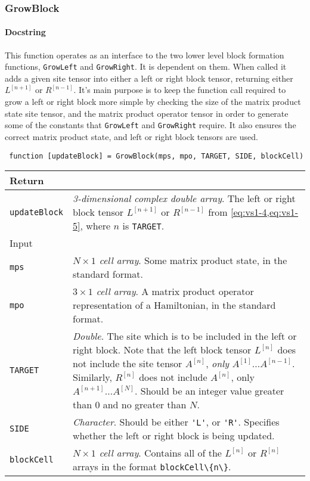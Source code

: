  \subsubsection{GrowBlock}
 \paragraph{Docstring} This function operates as an interface to the two lower level block formation functions, \lstinline$GrowLeft$ and \lstinline$GrowRight$. It is dependent on them. When called it adds a given site tensor into either a left or right block tensor, returning either \(L^{[n+1]}\) or \(R^{[n-1]}\). It's main purpose is to keep the function call required to grow a left or right block more simple by checking the size of the matrix product state site tensor, and the matrix product operator tensor in order to generate some of the constants that \lstinline$GrowLeft$ and \lstinline$GrowRight$ require. It also ensures the correct matrix product state, and left or right block tensors are used.
 \begin{lstlisting}
 function [updateBlock] = GrowBlock(mps, mpo, TARGET, SIDE, blockCell) \end{lstlisting}
 \begin{longtabu}{X[1,l]X[4,l]}
 \hline
 Return & \\ \hline
 \lstinline$updateBlock$ & \emph{3-dimensional complex double array}. The left or right block tensor \(L^{[n+1]}\) or \(R^{[n-1]}\) from \cref{eq:vs1-4,eq:vs1-5}, where \(n\) is \lstinline$TARGET$. \\ \hline
 Input & \\ \hline
 \lstinline$mps$ & \emph{\(N \times 1\) cell array}. Some matrix product state, in the standard format. \\
 \lstinline$mpo$ & \emph{\(3 \times 1\) cell array}. A matrix product operator representation of a Hamiltonian, in the standard format. \\
 \lstinline$TARGET$ & \emph{Double}. The site which is to be included in the left or right block. Note that the left block tensor \(L^{[n]}\) does not include the site tensor \(A^{[n]}\), \emph{only} \(A^{[1]} \ldots A^{[n-1]}\). Similarly, \(R^{[n]}\) does not include \(A^{[n]}\), only \(A^{[n+1]} \ldots A^{[N]}\). Should be an integer value greater than 0 and no greater than \(N\). \\
 \lstinline$SIDE$ & \emph{Character}. Should be either \lstinline$'L'$, or \lstinline$'R'$. Specifies whether the left or right block is being updated. \\
 \lstinline$blockCell$ & \emph{\(N \times 1\) cell array}. Contains all of the \(L^{[n]}\) or \(R^{[n]}\) arrays in the format \lstinline$blockCell\{n\}$. \\
 \hline
 \end{longtabu}

